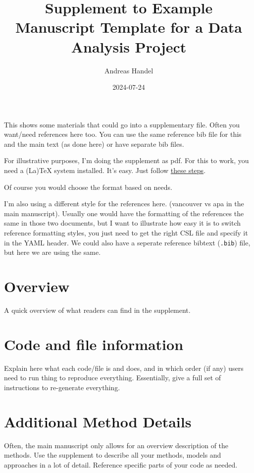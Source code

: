 \documentclass[
  letterpaper,
  DIV=11,
  numbers=noendperiod]{scrartcl}
\title{Supplement to Example Manuscript Template for a Data Analysis
Project}
\author{Andreas Handel}
\date{2024-07-24}
\begin{document}
\maketitle

This shows some materials that could go into a supplementary file. Often
you want/need references here too. You can use the same reference bib
file for this and the main text (as done here) or have separate bib
files.

For illustrative purposes, I'm doing the supplement as pdf. For this to
work, you need a (La)TeX system installed. It's easy. Just follow
\href{https://quarto.org/docs/output-formats/pdf-basics.html}{these
steps}.

Of course you would choose the format based on needs.

I'm also using a different style for the references here. (vancouver vs
apa in the main manuscript). Usually one would have the formatting of
the references the same in those two documents, but I want to illustrate
how easy it is to switch reference formatting styles, you just need to
get the right CSL file and specify it in the YAML header. We could also
have a seperate reference bibtext (\texttt{.bib}) file, but here we are
using the same.

\section{Overview}\label{overview}

A quick overview of what readers can find in the supplement.

\section{Code and file information}\label{code-and-file-information}

Explain here what each code/file is and does, and in which order (if
any) users need to run thing to reproduce everything. Essentially, give
a full set of instructions to re-generate everything.

\newpage{}

\section{Additional Method Details}\label{additional-method-details}

Often, the main manuscript only allows for an overview description of
the methods. Use the supplement to describe all your methods, models and
approaches in a lot of detail. Reference specific parts of your code as
needed.
\end{document}
